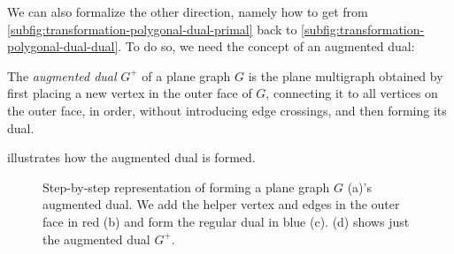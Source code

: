 We can also formalize the other direction, namely how to get from \cref{subfig:transformation-polygonal-dual-primal} back to \cref{subfig:transformation-polygonal-dual-dual}. To do so, we need the concept of an augmented dual:
%
\begin{definition}
	The \emph{augmented dual} $G^+$ of a plane graph $G$ is the plane multigraph obtained by first placing a new vertex in the outer face of $G$, connecting it to all vertices on the outer face, in order, without introducing edge crossings, and then forming its dual.
	\label{def:augmented-dual}
\end{definition}

 illustrates how the augmented dual is formed.
%
\begin{figure}[H]
	\centering
	\quad
	\quad
	\quad
	\caption{Step-by-step representation of forming a plane graph $G$ (a)'s augmented dual. We add the helper vertex and edges in the outer face in red (b) and form the regular dual in blue (c). (d) shows just the augmented dual $G^+$.}
	\label{fig:transformation-augmented-dual}
\end{figure}

